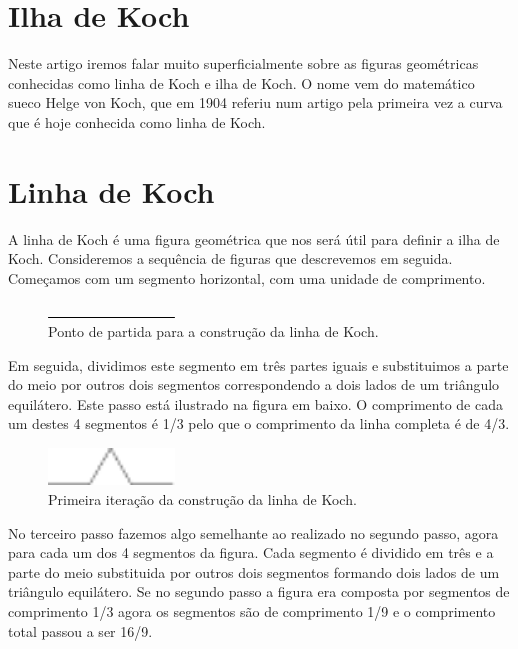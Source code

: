 \documentclass[11pt]{article}
\begin{document}
\section*{Ilha de Koch}

Neste artigo iremos falar muito superficialmente sobre as figuras
geométricas conhecidas como linha de Koch e ilha de Koch. O nome vem
do matemático sueco Helge von Koch, que em 1904 referiu num artigo
pela primeira vez a curva que é hoje conhecida como linha de Koch.





\section{Linha de Koch}

A linha de Koch é uma figura geométrica que nos será útil para definir
a ilha de Koch. Consideremos a sequência de figuras que descrevemos em
seguida. Começamos com um segmento horizontal, com uma unidade de
comprimento.

\begin{figure}[H]
  \centering
  \includegraphics[width=0.3\textwidth]{../images/koch-line-00.pdf}
  \caption{Ponto de partida para a construção da linha de Koch.}
\end{figure}


Em seguida, dividimos este segmento em três partes iguais e
substituimos a parte do meio por outros dois segmentos correspondendo
a dois lados de um triângulo equilátero. Este passo está ilustrado na
figura em baixo. O comprimento de cada um destes 4 segmentos é 1/3
pelo que o comprimento da linha completa é de 4/3.

\begin{figure}[H]
  \centering
  \includegraphics[width=0.3\textwidth]{../images/koch-line-01.pdf}
  \caption{Primeira iteração da construção da linha de Koch.}
\end{figure}


No terceiro passo fazemos algo semelhante ao realizado no segundo
passo, agora para cada um dos 4 segmentos da figura. Cada segmento é
dividido em três e a parte do meio substituida por outros dois
segmentos formando dois lados de um triângulo equilátero. Se no
segundo passo a figura era composta por segmentos de comprimento 1/3
agora os segmentos são de comprimento 1/9 e o comprimento total passou
a ser 16/9.
\end{document}
